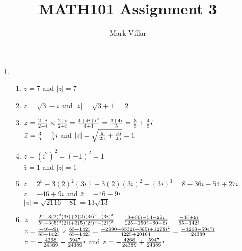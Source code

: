 \documentclass[12pt]{amsart}
\title{MATH101 Assignment 3}
\author{Mark Villar}
\begin{document}
 

\maketitle 

\begin{enumerate}
	
	\item 
	
		\begin{enumerate}
		
			\item $\bar z=7$ and $|z|=7$\\
			
			\item  $\bar z=\sqrt{3}-i$ and $|z|=\sqrt{3+1}=2$\\
			
			\item	$z= {2+i \over 2-i} \times {2+i \over 2+i}={4+4i+i^2 \over 4+1}={3+4i \over 5}=
				{3 \over 5}+{4 \over5}i$\\
				
				$\bar z ={3 \over 5}-{4 \over5}i$ and $|z|=\sqrt{{9\over25}+{16\over25}}=1$\\
			
			\item $z=(i^2)^2=(-1)^2=1$\\
				
				$\bar z=1$ and $|z|=1$\\
			
			\item $z=2^3-3(2)^2(3i)+3(2)(3i)^2-(3i)^3=8-36i-54+27i$\\
			
				$z=-46+9i$ and $\bar z=-46-9i$\\
				
				$|z|=\sqrt{2116+81}=13\sqrt{13}$\\
				
			\item $z={2^3+3(2)^2(3i)+3(2)(3i)^2+(3i)^3 \over 5^3-3(5)^2(2i)+3(5)(2i)^2-(2i)^3}=
				{8+36i-54-27i \over 125-150i-60+8i}={-46+9i \over 65-142i}$\\
				
				$z={-46+9i \over 65-142i} \times {65+142i \over 65+142i}=
				{-2990-6532i+585i+1278i^2 \over 4225+20164}={-4268-5947i \over 24389}$\\
				
				$z=-{4268 \over 24389}-{5947 \over 24389}i$ and 
				$\bar z=-{4268 \over 24389}+{5947 \over 24389}i$\\
				

\end{enumerate}
\end{enumerate}
\end{document}
